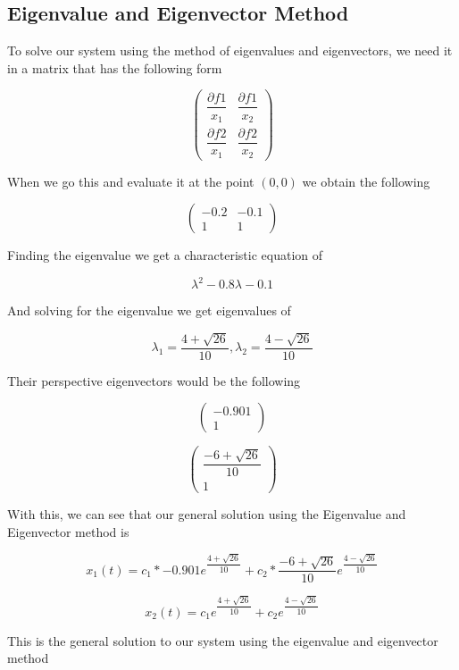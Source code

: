 \documentclass[12pt]{report}
\begin{document}
\subsection{Eigenvalue and Eigenvector Method}
\begin{flushleft}
To solve our system using the method of eigenvalues and eigenvectors, we need it in a matrix that has the following form
\end{flushleft} 
\[ \left( \begin{array}{ccc}
\dfrac{\partial f1}{x_{1}} & \dfrac{\partial f1}{x_{2}}\\
\dfrac{\partial f2}{x_{1}} & \dfrac{\partial f2}{x_{2}} \end{array} \right)\] 
\begin{flushleft}
When we go this and evaluate it at the point $(0,0)$ we obtain the following 
\end{flushleft} 
\[ \left( \begin{array}{ccc}
-0.2 & -0.1 \\
1 & 1 \end{array} \right)\] 
\begin{flushleft} 
Finding the eigenvalue we get a characteristic equation of 
\end{flushleft} 
$$ \lambda^{2} - 0.8 \lambda - 0.1$$ 
\begin{flushleft}
And solving for the eigenvalue we get eigenvalues of 
\end{flushleft} 
$$\lambda_{1} = \dfrac{4+\sqrt{26}}{10}, \lambda_{2} = \dfrac{4-\sqrt{26}}{10}$$
\begin{flushleft} 
Their perspective eigenvectors would be the following
\end{flushleft} 
\[ \left( \begin{array}{c}
-0.901 \\
1 \end{array} \right)\] 

 \[ \left( \begin{array}{c}
\dfrac{-6+\sqrt{26}}{10} \\
1 \end{array} \right)\] 

\begin{flushleft} 
With this, we can see that our general solution using the Eigenvalue and Eigenvector method is
\end{flushleft} 
$$x_{1}(t) = c_{1} * -0.901e^{ \dfrac{4+\sqrt{26}}{10}} +c_{2}*\dfrac{-6+\sqrt{26}}{10}e^{ \dfrac{4-\sqrt{26}}{10}}$$

$$ x_{2}(t) = c_{1}e^{ \dfrac{4+\sqrt{26}}{10}} +c_{2}e^{ \dfrac{4-\sqrt{26}}{10}}$$
\begin{flushleft} 
This is the general solution to our system using the eigenvalue and eigenvector method
\end{flushleft} 
\end{document}
